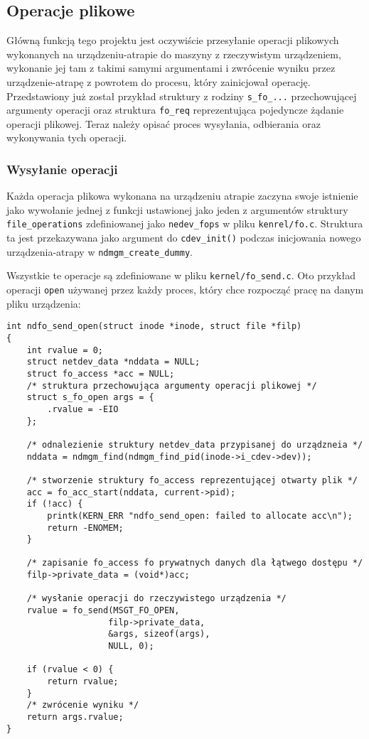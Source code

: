 \subsection{Operacje plikowe}

Główną funkcją tego projektu jest oczywiście przesyłanie operacji
plikowych wykonanych na urządzeniu-atrapie do maszyny z rzeczywistym
urządzeniem, wykonanie jej tam z takimi samymi argumentami i zwrócenie
wyniku przez urządzenie-atrapę z powrotem do procesu, który zainicjował
operację. Przedstawiony już został przykład struktury z rodziny
\texttt{s\_fo\_...} przechowującej argumenty operacji oraz struktura
\texttt{fo\_req} reprezentująca pojedyncze żądanie operacji plikowej.
Teraz należy opisać proces wysyłania, odbierania oraz wykonywania tych
operacji.

\subsubsection{Wysyłanie operacji}

Każda operacja plikowa wykonana na urządzeniu atrapie zaczyna swoje
istnienie jako wywołanie jednej z funkcji ustawionej jako jeden z
argumentów struktury \texttt{file\_operations} zdefiniowanej jako
\texttt{nedev\_fops} w pliku \texttt{kenrel/fo.c}. Struktura ta jest
przekazywana jako argument do \texttt{cdev\_init()} podczas inicjowania
nowego urządzenia-atrapy w \texttt{ndmgm\_create\_dummy}.

Wszystkie te operacje są zdefiniowane w pliku
\texttt{kernel/fo\_send.c}. Oto przykład operacji \texttt{open} używanej
przez każdy proces, który chce rozpocząć pracę na danym pliku
urządzenia:

\begin{verbatim}
int ndfo_send_open(struct inode *inode, struct file *filp)
{
    int rvalue = 0;
    struct netdev_data *nddata = NULL;
    struct fo_access *acc = NULL;
    /* struktura przechowująca argumenty operacji plikowej */
    struct s_fo_open args = {
        .rvalue = -EIO
    };

    /* odnalezienie struktury netdev_data przypisanej do urządzneia */
    nddata = ndmgm_find(ndmgm_find_pid(inode->i_cdev->dev));

    /* stworzenie struktury fo_access reprezentującej otwarty plik */
    acc = fo_acc_start(nddata, current->pid);
    if (!acc) {
        printk(KERN_ERR "ndfo_send_open: failed to allocate acc\n");
        return -ENOMEM;
    }

    /* zapisanie fo_access fo prywatnych danych dla łątwego dostępu */
    filp->private_data = (void*)acc;

    /* wysłanie operacji do rzeczywistego urządzenia */
    rvalue = fo_send(MSGT_FO_OPEN,
                    filp->private_data,
                    &args, sizeof(args),
                    NULL, 0);

    if (rvalue < 0) {
        return rvalue;
    }
    /* zwrócenie wyniku */
    return args.rvalue;
}
\end{verbatim}

